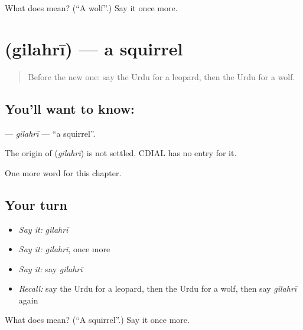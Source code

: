 \begin{tcolorbox}[breakable,colback=teal!4,colframe=teal!35!black,title={Before you move on}]
What does  mean? (\textquotedblleft{}A wolf\textquotedblright{}.) Say it once more.
\end{tcolorbox}
\section[\texorpdfstring{\ur{گلہری} (gilahrī)}{گلہری (gilahrī)}]{ (gilahrī) — a squirrel}

\label{lesson:UR-C227-gilahri}



\begin{quote}
Before the new one: say the Urdu for a leopard, then the Urdu for a wolf.
\end{quote}

\subsection*{You'll want to know: }
\textbf{} — \emph{gilahrī} — \textquotedblleft{}a squirrel\textquotedblright{}.

\begin{cousinweb}
The origin of \textbf{} (\emph{gilahrī}) is not settled. CDIAL has no entry for it.
\end{cousinweb}

\begin{grammarlens}[title={What you've built}]
One more word for this chapter.
\end{grammarlens}

\subsection*{Your turn}
\begin{itemize}
\raggedright
  \item \emph{Say it:} \emph{gilahrī}
  \item \emph{Say it:} \emph{gilahrī}, once more
  \item \emph{Say it:} say \emph{gilahrī}
  \item \emph{Recall:} say the Urdu for a leopard, then the Urdu for a wolf, then say \emph{gilahrī} again
\end{itemize}

\begin{tcolorbox}[breakable,colback=teal!4,colframe=teal!35!black,title={Before you move on}]
What does  mean? (\textquotedblleft{}A squirrel\textquotedblright{}.) Say it once more.
\end{tcolorbox}
